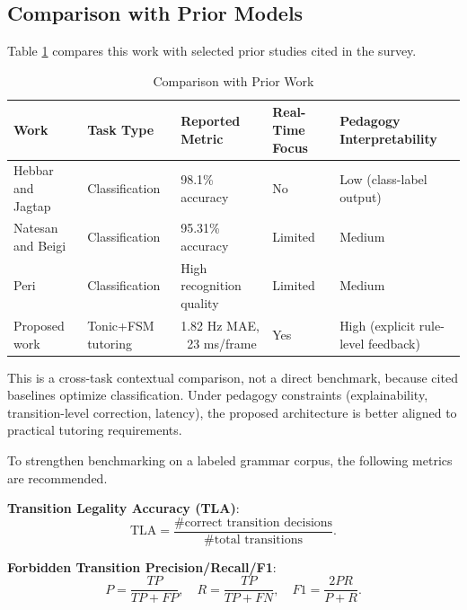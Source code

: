 \documentclass{ieeeaccess}
\begin{document}

\subsection{Comparison with Prior Models}
\vspace{6pt}
Table \ref{tab:comparison} compares this work with selected prior studies cited in the survey.

\FloatBarrier\vspace{6pt}
\begin{table}[ht]
\caption{Comparison with Prior Work}
\label{tab:comparison}
\centering
\setlength{\tabcolsep}{2pt}
\begin{tabular}{p{1.6cm}p{1.4cm}p{1.8cm}p{1.4cm}p{1.8cm}}
\toprule
Work & Task Type & Reported Metric & Real-Time Focus & Pedagogy Interpretability \\
\midrule
Hebbar and Jagtap \cite{b5} & Classification & 98.1\% accuracy & No & Low (class-label output) \\
Natesan and Beigi \cite{b3} & Classification & 95.31\% accuracy & Limited & Medium \\
Peri \cite{b4} & Classification & High recognition quality & Limited & Medium \\
Proposed work & Tonic+FSM tutoring & 1.82 Hz MAE, ~23 ms/frame & Yes & High (explicit rule-level feedback) \\
\bottomrule
\end{tabular}
\end{table}
\vspace{14pt}
\FloatBarrier

This is a cross-task contextual comparison, not a direct benchmark, because cited baselines optimize classification. Under pedagogy constraints (explainability, transition-level correction, latency), the proposed architecture is better aligned to practical tutoring requirements.

To strengthen benchmarking on a labeled grammar corpus, the following metrics are recommended.

\textbf{Transition Legality Accuracy (TLA)}:
\begin{equation}
\text{TLA} = \frac{\#\text{correct transition decisions}}{\#\text{total transitions}}.
\end{equation}

\textbf{Forbidden Transition Precision/Recall/F1}:
\begin{equation}
P = \frac{TP}{TP+FP},\quad R = \frac{TP}{TP+FN},\quad F1 = \frac{2PR}{P+R}.
\end{equation}
\end{document}
